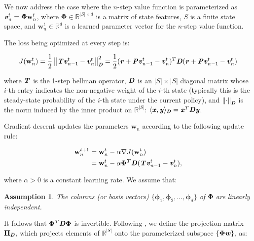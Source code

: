 \documentclass{article}
\newcommand{\R}{\mathbb{R}}
\renewcommand{\vec}[1]{\textbf{\textit{#1}}}
\newcommand{\val}{\vec{v}}
\newcommand{\valt}{\val}
\newcommand{\params}{\textbf{w}}
\newcommand{\Features}{\bm{\Phi}}
\newcommand{\features}{\bm{\phi}}
\renewcommand{\r}{\textbf{\textit{r}}}
\newcommand{\transitionmtx}{\textbf{\textit{P}}}
\newcommand{\projectionmtx}{\bm{\Pi}}
\newcommand{\densitymtx}{\textbf{\textit{D}}}
\newcommand{\bellmanop}{\textbf{\textit{T}}}
\newcommand{\norm}[1]{\left\lVert #1 \right\rVert}
\newtheorem{assumption}{Assumption}
\begin{document}
We now address the case where the $n$-step value function is parameterized as $\valt_n^t = \Features\params_n^t$, where $\Features \in \R^{|S| \times d}$ is a matrix of state features, $S$ is a finite state space, and $\params_n^t \in \R^d$ is a learned parameter vector for the $n$-step value function.

The loss being optimized at every step is:

\begin{equation}
	J(\params_n^t) = \frac{1}{2}\norm{\bellmanop\valt_{n-1}^t - \valt_n^t}_\densitymtx^2 = \frac{1}{2}(\r + \transitionmtx\valt_{n-1}^t - \valt_n^t)^T\densitymtx(\r + \transitionmtx\valt_{n-1}^t - \valt_n^t)
\end{equation}

where $\bellmanop$ is the 1-step bellman operator, $\densitymtx$ is an $|S| \times |S|$ diagonal matrix whose $i$-th entry indicates the non-negative weight of the $i$-th state (typically this is the steady-state probability of the $i$-th state under the current policy), and $\norm{\cdot}_\densitymtx$ is the norm induced by the inner product on $\mathbb{R}^{|S|}$: $\langle \vec{x} , \vec{y} \rangle_\densitymtx = \vec{x}^T\densitymtx \vec{y}$.

Gradient descent updates the parameters $\params_n$ according to the following update rule:

\begin{equation}\label{equation_linear_gradient_descent}
\begin{split}
	\params_n^{t+1} &= \params_n^t - \alpha \nabla J(\params_n^t)\\
	& = \params_n^t - \alpha \Features^T\densitymtx(\bellmanop\valt_{n-1}^t - \valt_n^t),
\end{split}
\end{equation}

where $\alpha > 0$ is a constant learning rate. We assume that:

\begin{assumption}\label{assumption_full_rank}
 The columns (or basis vectors) $\{\features_1, \features_2, \dots, \features_d\}$ of $\Features$ are linearly independent.
\end{assumption}

It follows that $\Features^T\densitymtx\Features$ is invertible. Following \cite{tsitsiklis1997analysis}, we define the projection matrix $\projectionmtx_\densitymtx$, which projects elements of $\mathbb{R}^{|S|}$ onto the parameterized subspace $\{\Features\vec{w}\}$, as:
\end{document}

